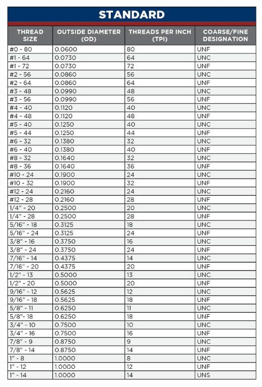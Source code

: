 \documentclass[12pt, a4paper]{article}
\begin{document}
		\includegraphics{Introduction to Nut and Bolt Sizes_files/6307bab88eccb893095369.jpg}
		\newpage
\end{document}

